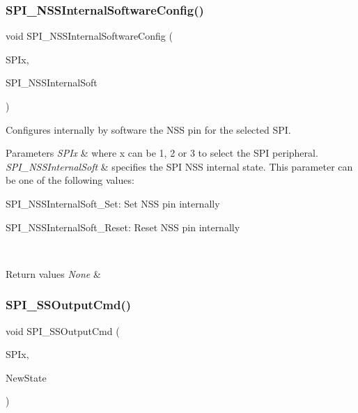 \subsubsection{\texorpdfstring{SPI\_NSSInternalSoftwareConfig()}{SPI\_NSSInternalSoftwareConfig()}}
{\footnotesize\ttfamily void S\+P\+I\+\_\+\+N\+S\+S\+Internal\+Software\+Config (\begin{DoxyParamCaption}\item[{\mbox{\hyperlink{struct_s_p_i___type_def}{S\+P\+I\+\_\+\+Type\+Def}} $\ast$}]{S\+P\+Ix,  }\item[{uint16\+\_\+t}]{S\+P\+I\+\_\+\+N\+S\+S\+Internal\+Soft }\end{DoxyParamCaption})}



Configures internally by software the N\+SS pin for the selected S\+PI. 


\begin{DoxyParams}{Parameters}
{\em S\+P\+Ix} & where x can be 1, 2 or 3 to select the S\+PI peripheral. \\
\hline
{\em S\+P\+I\+\_\+\+N\+S\+S\+Internal\+Soft} & specifies the S\+PI N\+SS internal state. This parameter can be one of the following values\+: \begin{DoxyItemize}
\item S\+P\+I\+\_\+\+N\+S\+S\+Internal\+Soft\+\_\+\+Set\+: Set N\+SS pin internally \item S\+P\+I\+\_\+\+N\+S\+S\+Internal\+Soft\+\_\+\+Reset\+: Reset N\+SS pin internally \end{DoxyItemize}
\\
\hline
\end{DoxyParams}

\begin{DoxyRetVals}{Return values}
{\em None} & \\
\hline
\end{DoxyRetVals}
\mbox{\label{group___s_p_i___exported___functions_ga4ec54abdedf6cd17403d853a926d91c1}} 
\subsubsection{\texorpdfstring{SPI\_SSOutputCmd()}{SPI\_SSOutputCmd()}}
{\footnotesize\ttfamily void S\+P\+I\+\_\+\+S\+S\+Output\+Cmd (\begin{DoxyParamCaption}\item[{\mbox{\hyperlink{struct_s_p_i___type_def}{S\+P\+I\+\_\+\+Type\+Def}} $\ast$}]{S\+P\+Ix,  }\item[{\mbox{\hyperlink{group___exported__types_gac9a7e9a35d2513ec15c3b537aaa4fba1}{Functional\+State}}}]{New\+State }\end{DoxyParamCaption})}



